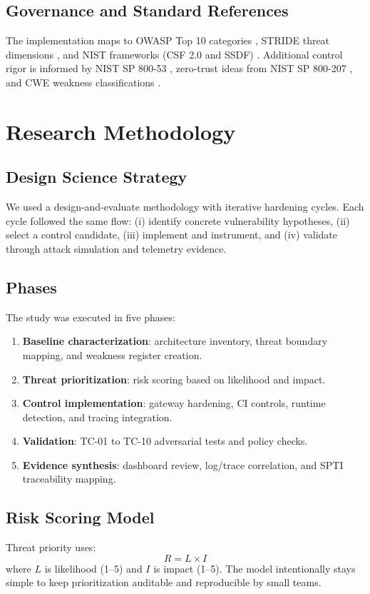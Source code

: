\documentclass[conference]{IEEEtran}
\begin{document}
\subsection{Governance and Standard References}
The implementation maps to OWASP Top 10 categories \cite{owasp2021}, STRIDE threat dimensions \cite{shostack2014}, and NIST frameworks (CSF 2.0 and SSDF) \cite{nistcsf,devsecopsnist}. Additional control rigor is informed by NIST SP 800-53 \cite{nist80053}, zero-trust ideas from NIST SP 800-207 \cite{nist800207}, and CWE weakness classifications \cite{cwe}.

\section{Research Methodology}
\subsection{Design Science Strategy}
We used a design-and-evaluate methodology with iterative hardening cycles. Each cycle followed the same flow: (i) identify concrete vulnerability hypotheses, (ii) select a control candidate, (iii) implement and instrument, and (iv) validate through attack simulation and telemetry evidence.

\subsection{Phases}
The study was executed in five phases:
\begin{enumerate}
\item \textbf{Baseline characterization}: architecture inventory, threat boundary mapping, and weakness register creation.
\item \textbf{Threat prioritization}: risk scoring based on likelihood and impact.
\item \textbf{Control implementation}: gateway hardening, CI controls, runtime detection, and tracing integration.
\item \textbf{Validation}: TC-01 to TC-10 adversarial tests and policy checks.
\item \textbf{Evidence synthesis}: dashboard review, log/trace correlation, and SPTI traceability mapping.
\end{enumerate}

\subsection{Risk Scoring Model}
Threat priority uses:
\begin{equation}
R = L \times I
\end{equation}
where $L$ is likelihood (1--5) and $I$ is impact (1--5). The model intentionally stays simple to keep prioritization auditable and reproducible by small teams.
\end{document}
